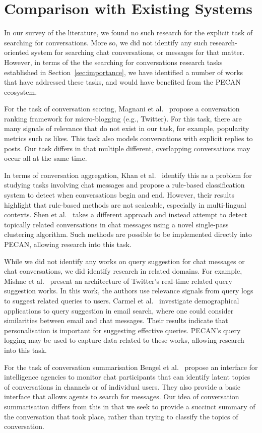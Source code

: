 \section{Comparison with Existing Systems}

In our survey of the literature, we found no such research for the explicit task of searching for conversations. More so, we did not identify any such research-oriented system for searching chat conversations, or messages for that matter. However, in terms of the the searching for conversations research tasks established in Section~\ref{sec:importance}, we have identified a number of works that have addressed these tasks, and would have benefited from the PECAN ecosystem.

For the task of conversation scoring, Magnani et al.~\cite{magnani2012conversation} propose a conversation ranking framework for micro-blogging (e.g., Twitter). For this task, there are many signals of relevance that do not exist in our task, for example, popularity metrics such as likes. This task also models conversations with explicit replies to posts. Our task differs in that multiple different, overlapping conversations may occur all at the same time.

In terms of conversation aggregation, Khan et al.~\cite{khan2002mining} identify this as a problem for studying tasks involving chat messages and propose a rule-based classification system to detect when conversations begin and end. However, their results highlight that rule-based methods are not scaleable, especially in multi-lingual contexts. Shen et al.~\cite{shen2006thread} takes a different approach and instead attempt to detect topically related conversations in chat messages using a novel single-pass clustering algorithm. Such methods are possible to be implemented directly into PECAN, allowing research into this task.

While we did not identify any works on query suggestion for chat messages or chat conversations, we did identify research in related domains. For example, Mishne et al.~\cite{mishne2013fast} present an architecture of Twitter's real-time related query suggestion works. In this work, the authors use relevance signals from query logs to suggest related queries to users. Carmel et al.~\cite{carmel2017demographics} investigate demographical applications to query suggestion in email search, where one could consider similarities between email and chat messages. Their results indicate that personalisation is important for suggesting effective queries. PECAN's query logging may be used to capture data related to these works, allowing research into this task.

For the task of conversation summarisation Bengel et al.~\cite{bengel2004chattrack} propose an interface for intelligence agencies to monitor chat participants that can identify latent topics of conversations in channels or of individual users. They also provide a basic interface that allows agents to search for messages. Our idea of conversation summarisation differs from this in that we seek to provide a succinct summary of the conversation that took place, rather than trying to classify the topics of conversation. 
